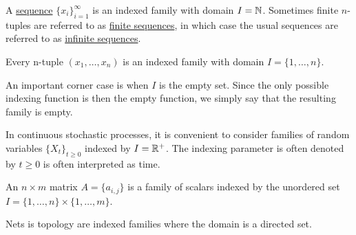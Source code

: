 \begin{definition}\label{def:sequence}
  A \ul{sequence} $\{ x_i \}_{i=1}^\infty$ is an indexed family with domain $I = \mathbb N$. Sometimes finite $n$-tuples are referred to as \ul{finite sequences}, in which case the usual sequences are referred to as \ul{infinite sequences}.
\end{definition}

\begin{example}\label{ex:indexed_families}
  \mbox{}
  \begin{defenum}
    \item Every n-tuple $(x_1, \ldots, x_n)$ is an indexed family with domain $I = \{ 1, \ldots, n \}$.

    \item An important corner case is when $I$ is the empty set. Since the only possible indexing function is then the empty function, we simply say that the resulting family is empty.

    \item In continuous stochastic processes, it is convenient to consider families of random variables $\{ X_t \}_{t \geq 0}$ indexed by $I = \mathbb R^+$. The indexing parameter is often denoted by $t \geq 0$ is often interpreted as time.

    \item An $n \times m$ matrix $A = \{ a_{i,j} \}$ is a family of scalars indexed by the unordered set $I = \{ 1, \ldots, n \} \times \{ 1, \ldots, m \}$.

    \item Nets is topology are indexed families where the domain is a directed set.
  \end{defenum}
\end{example}
